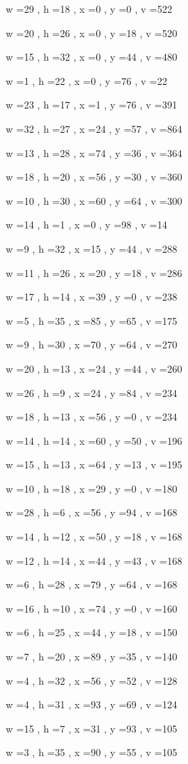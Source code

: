 \documentclass[11pt]{article}
\begin{document}
w =29 , h =18 , x =0 , y =0 , v =522
\par
w =20 , h =26 , x =0 , y =18 , v =520
\par
w =15 , h =32 , x =0 , y =44 , v =480
\par
w =1 , h =22 , x =0 , y =76 , v =22
\par
w =23 , h =17 , x =1 , y =76 , v =391
\par
w =32 , h =27 , x =24 , y =57 , v =864
\par
w =13 , h =28 , x =74 , y =36 , v =364
\par
w =18 , h =20 , x =56 , y =30 , v =360
\par
w =10 , h =30 , x =60 , y =64 , v =300
\par
w =14 , h =1 , x =0 , y =98 , v =14
\par
w =9 , h =32 , x =15 , y =44 , v =288
\par
w =11 , h =26 , x =20 , y =18 , v =286
\par
w =17 , h =14 , x =39 , y =0 , v =238
\par
w =5 , h =35 , x =85 , y =65 , v =175
\par
w =9 , h =30 , x =70 , y =64 , v =270
\par
w =20 , h =13 , x =24 , y =44 , v =260
\par
w =26 , h =9 , x =24 , y =84 , v =234
\par
w =18 , h =13 , x =56 , y =0 , v =234
\par
w =14 , h =14 , x =60 , y =50 , v =196
\par
w =15 , h =13 , x =64 , y =13 , v =195
\par
w =10 , h =18 , x =29 , y =0 , v =180
\par
w =28 , h =6 , x =56 , y =94 , v =168
\par
w =14 , h =12 , x =50 , y =18 , v =168
\par
w =12 , h =14 , x =44 , y =43 , v =168
\par
w =6 , h =28 , x =79 , y =64 , v =168
\par
w =16 , h =10 , x =74 , y =0 , v =160
\par
w =6 , h =25 , x =44 , y =18 , v =150
\par
w =7 , h =20 , x =89 , y =35 , v =140
\par
w =4 , h =32 , x =56 , y =52 , v =128
\par
w =4 , h =31 , x =93 , y =69 , v =124
\par
w =15 , h =7 , x =31 , y =93 , v =105
\par
w =3 , h =35 , x =90 , y =55 , v =105
\end{document}
